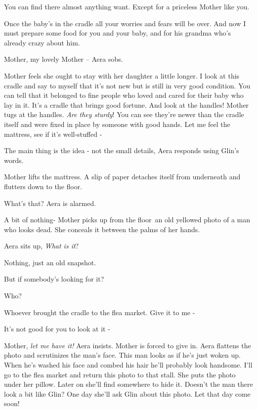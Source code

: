 \documentclass[letterpaper]{article}
\begin{document}
{\textquotedbl}You can find there almost anything want. Except for a priceless Mother like you.{\textquotedbl} 

{\textquotedbl}Once the baby's in the cradle all your worries and fears will be over. And now I must prepare some food
for you and your baby, and for his grandma who's already crazy about him.{\textquotedbl} 

{\textquotedbl}Mother, my lovely Mother --{\textquotedbl} Aera sobs. ~

Mother feels she ought to stay with her daughter a little longer. {\textquotedbl}I look at this cradle and say to myself
that it's not new but is\textcolor{red}{ }still in very good condition. You can tell that it belonged to fine people
who loved and cared for their baby who lay in it. It's a cradle that brings good fortune. And look at the
handles!{\textquotedbl} Mother tugs at the handles. {\textquotedbl}\textit{Are they sturdy}! You can see they're newer
than the cradle itself and were fixed in place by someone with good hands. Let me feel the mattress, see if it's
well-stuffed -{\textquotedbl} 

{\textquotedbl}The main thing is the idea - not the small details,{\textquotedbl} Aera responds using Glin's words. 

Mother lifts the mattress. A slip of paper detaches itself from underneath and\textcolor{red}{ }flutters down to the
floor. 

{\textquotedbl}What's that?{\textquotedbl} Aera is alarmed. 

{\textquotedbl}A bit of nothing-{\textquotedbl} Mother picks up from the floor~an old yellowed photo of a man who looks
dead. She conceals\textcolor{red}{ }it between the palms of her hands. 

Aera sits up, {\textquotedbl}\textit{What is it}?{\textquotedbl}~ 

{\textquotedbl}Nothing, just an old snapshot.{\textquotedbl} 

{\textquotedbl}But if somebody's looking for it?{\textquotedbl} 

{\textquotedbl}Who?{\textquotedbl} 

{\textquotedbl}Whoever brought the cradle to the flea market. Give it to me -{\textquotedbl} 

{\textquotedbl}It's not good for you to look at it -{\textquotedbl} 

{\textquotedbl}Mother, \textit{let me have it!}{\textquotedbl} Aera insists. Mother is forced to give in. Aera flattens
the photo and scrutinizes the man's face. {\textquotedbl}This man looks as if he's just woken up. When he's washed his
face and combed his hair he'll probably look handsome. I'll go to the flea market and return this photo to that
stall.{\textquotedbl} She puts the photo under her pillow. Later on she'll find somewhere to hide it. Doesn't the man
there look a bit like Glin? One day she'll ask Glin about this photo. Let that day come soon! 
\end{document}
